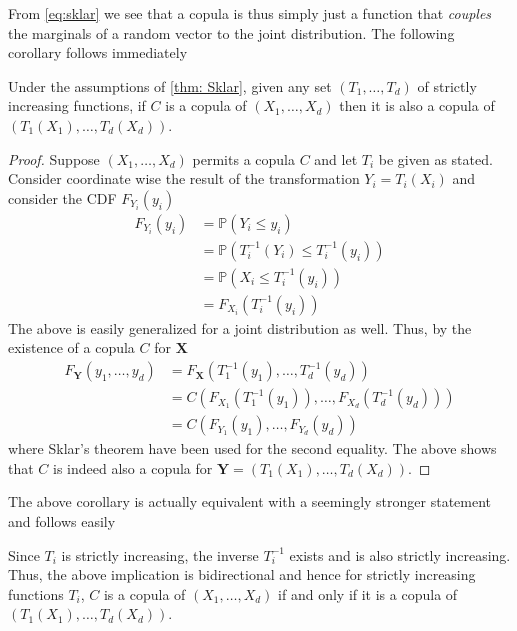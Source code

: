 \documentclass[../Thesis.tex]{subfiles}
\begin{document}
From \autoref{eq:sklar} we see that a copula is thus simply just a function that \textit{couples} the marginals of a random vector to the joint distribution. The following corollary follows immediately
\begin{corollary} \label{coro: Coordinate transformation}
    Under the assumptions of \autoref{thm: Sklar}, given any set $(T_1, \dots, T_d)$ of strictly increasing functions, if $C$ is a copula of $(X_1,\dots, X_d)$ then it is also a copula of $(T_1(X_1), \dots, T_d(X_d))$.
\end{corollary}
\begin{proof}
    Suppose $(X_1 , \dots , X_d)$ permits a copula $C$ and let $T_i$ be given as stated. Consider coordinate wise the result of the transformation $Y_i = T_i(X_i)$ and consider the CDF $F_{Y_i}(y_i)$
    \begin{align*}
        F_{Y_i}(y_i) & = \mathbb{P}\left(Y_i \leq y_i\right)                      \\
                     & = \mathbb{P}\left(T_i^{-1}(Y_i) \leq T_i^{-1}(y_i)\right)  \\
                     & = \mathbb{P}\left(X_i \leq T_i^{-1}\left(y_i\right)\right) \\
                     & = F_{X_i}\left(T_i^{-1}\left(y_i\right)\right)
    \end{align*}
    The above is easily generalized for a joint distribution as well. Thus, by the existence of a copula $C$ for $\boldsymbol{X}$
    \begin{align*}
        F_{\boldsymbol Y}(y_1, \dots, y_d) & = F_{\boldsymbol X} \left(T_1^{-1}\left(y_1\right),\dots , T_d^{-1}\left(y_d\right)\right)   \\
                                           & = C\left( F_{X_1}(T_1^{-1}\left(y_1\right)), \dots, F_{X_d}(T_d^{-1}\left(y_d\right))\right) \\
                                           & = C\left( F_{Y_1}(y_1), \dots, F_{Y_d}(y_d)\right)
    \end{align*}
    where Sklar's theorem have been used for the second equality. The above shows that $C$ is indeed also a copula for $\boldsymbol Y = \left(T_1(X_1), \dots, T_d(X_d)\right)$.
\end{proof}
The above corollary is actually equivalent with a seemingly stronger statement and follows easily
\begin{proposition}
    Since $T_i$ is strictly increasing, the inverse $T_i^{-1}$ exists and is also strictly increasing. Thus, the above implication is bidirectional and hence for strictly increasing functions $T_i$, $C$ is a copula of $\left(X_1,\dots,X_d\right)$ if and only if it is a copula of $\left(T_1(X_1),\dots, T_d(X_d)\right)$.
\end{proposition}
\end{document}
